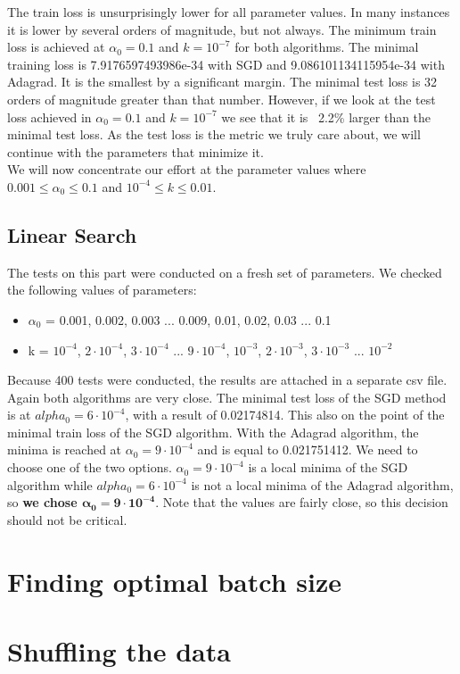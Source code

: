 \documentclass[12pt]{scrartcl}
\begin{document}
The train loss is unsurprisingly lower for all parameter values. In many instances it is lower by several orders of magnitude, but not always. The minimum train loss is achieved at $\alpha_0=0.1$ and $k=10^{-7}$ for both algorithms. The minimal training loss is 7.9176597493986e-34 with SGD and 9.086101134115954e-34 with Adagrad. It is the smallest by a significant margin. The minimal test loss is 32 orders of magnitude greater than that number. However, if we look at the test loss achieved in $\alpha_0=0.1$ and $k=10^{-7}$ we see that it is ~2.2\% larger than the minimal test loss. As the test loss is the metric we truly care about, we will continue with the parameters that minimize it.\\

We will now concentrate our effort at the parameter values where $0.001 \leq \alpha_0 \leq 0.1$ and $10^{-4} \leq k \leq 0.01$.

\subsection{Linear Search}
The tests on this part were conducted on a fresh set of parameters. We checked the following values of parameters:
\begin{itemize}
\item $\alpha_0$ = 0.001, 0.002, 0.003 ... 0.009, 0.01, 0.02, 0.03 ... 0.1
\item k = $10^{-4}$, $2 \cdot 10^{-4}$, $3 \cdot 10^{-4}$ ... $9 \cdot 10^{-4}$, $10^{-3}$, $2 \cdot 10^{-3}$, $3 \cdot 10^{-3}$ ... $10^{-2}$
\end{itemize}

Because 400 tests were conducted, the results are attached in a separate csv file.\\

Again both algorithms are very close. The minimal test loss of the SGD method is at $alpha_0 = 6\cdot 10^{-4}$, with a result of 0.02174814. This also on the point of the minimal train loss of the SGD algorithm. With the Adagrad algorithm, the minima is reached at $\alpha_0 = 9\cdot 10^{-4}$ and is equal to 0.021751412. We need to choose one of the two options. $\alpha_0 = 9\cdot 10^{-4}$ is a local minima of the SGD algorithm while $alpha_0 = 6\cdot 10^{-4}$ is not a local minima of the Adagrad algorithm, so \textbf{we chose $\bm{\alpha_0 = 9\cdot 10^{-4}}$}. Note that the values are fairly close, so this decision should not be critical.

\section{Finding optimal batch size}

\section{Shuffling the data}
\end{document}
